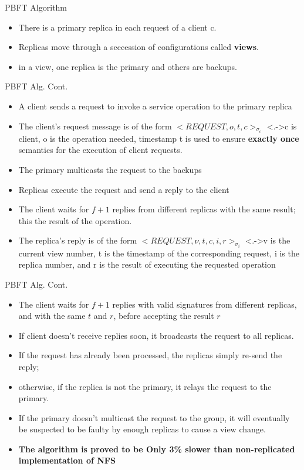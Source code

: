 \documentclass[../document.tex]{subfiles}
\begin{document}
\begin{frame}{PBFT Algorithm}
	\begin{itemize}
		\item <+-> There is a primary replica in each request of a client c. 
		\item<+-> Replicas move through a seccession of configurations called \textbf{views}.
		\item <+-> in a view, one replica is the primary and others are backups. 
	\end{itemize}

\end{frame}

\begin{frame}{PBFT Alg. Cont.}
	\uncover<+->{A very brief description of the Algorithm:}
	\begin{itemize}
		\item<+-> A client sends a request to invoke a service operation to the primary replica
		\item<+-> The client's request message is of the form $<REQUEST, o, t, c>_{\sigma_{c}}$ \note<.->{\small c is client, o is the operation needed, timestamp t is used to ensure \textbf{exactly once } semantics for the execution of client requests.}
		\item<+-> The primary multicasts the request to the backups
		\item<+-> Replicas execute the request and send a reply to the client
		\item<+-> The client waits for $f+1$ replies from different replicas with the same result; this the result of the operation.
		\item<+-> The replica's reply is of the form $<REQUEST, \nu, t, c, i, r>_{\sigma_{i}}$ \note<.->{\small v is the current view number, t is the timestamp of the corresponding request, i is the replica number, and r is the result of executing the requested operation}
	\end{itemize}
\end{frame}

\begin{frame}{PBFT Alg. Cont.}
\begin{itemize}
	\item<+-> The client waits for $f+1$ replies with valid signatures from different replicas, and with the same $t$ and $r$, before accepting the result $r$
	\item<+-> If client doesn't receive replies soon, it broadcasts the request to all replicas.
	\item<+-> If the request has already been processed, the replicas simply re-send the reply;
	\item<+-> otherwise, if the replica is not the primary, it relays the request to the primary. 
	\item<+-> If the primary doesn't multicast the request to the group, it will eventually be suspected to be faulty by enough replicas to cause a view change.
	\item<+-> \textbf{The algorithm is proved to be Only 3\% slower than non-replicated implementation of NFS}
\end{itemize}

\end{frame}
\end{document}
